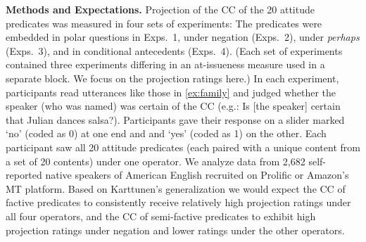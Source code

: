 \documentclass[12pt, a4paper]{article}
\begin{document}
\noindent 
{\bf Methods and Expectations.}
	Projection of the CC of the 20 attitude predicates was measured in four sets of experiments: The predicates were embedded in polar questions in Exps.~1, under negation (Exps.~2), under {\em perhaps} (Exps.~3), and in conditional antecedents (Exps.~4). (Each set of experiments contained three experiments differing in an at-issueness measure used in a separate block. We focus on the projection ratings here.) In each experiment, participants read utterances like those in \ref{ex:family} and judged whether the speaker (who was named) was certain of the CC (e.g.: Is [the speaker] certain that Julian dances salsa?). Participants gave their response on a slider marked `no' (coded as 0) at one end and and `yes' (coded as 1) on the other. Each participant saw all 20 attitude predicates (each paired with a unique content from a set of 20 contents) under one operator. We analyze data from 2,682 self-reported native speakers of American English recruited on Prolific or Amazon's MT platform. Based on Karttunen's generalization we would expect the CC of factive predicates to consistently receive relatively high projection ratings under all four operators, and the CC of semi-factive predicates to exhibit high projection ratings under negation and lower ratings under the other operators.

\end{document}
